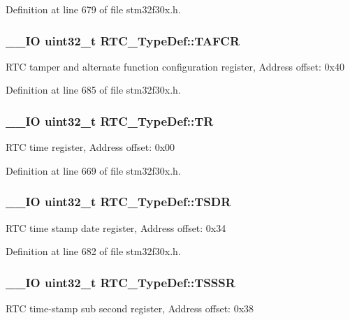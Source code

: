 Definition at line 679 of file stm32f30x.\-h.

\hypertarget{struct_r_t_c___type_def_a498ecce9715c916dd09134fddd0072c0}{
\subsubsection[{T\-A\-F\-C\-R}]{\setlength{\rightskip}{0pt plus 5cm}\-\_\-\-\_\-\-I\-O {\bf uint32\-\_\-t} R\-T\-C\-\_\-\-Type\-Def\-::\-T\-A\-F\-C\-R}}\label{struct_r_t_c___type_def_a498ecce9715c916dd09134fddd0072c0}
R\-T\-C tamper and alternate function configuration register, Address offset\-: 0x40 

Definition at line 685 of file stm32f30x.\-h.

\hypertarget{struct_r_t_c___type_def_a2e8783857f8644a4eb80ebc51e1cba42}{
\subsubsection[{T\-R}]{\setlength{\rightskip}{0pt plus 5cm}\-\_\-\-\_\-\-I\-O {\bf uint32\-\_\-t} R\-T\-C\-\_\-\-Type\-Def\-::\-T\-R}}\label{struct_r_t_c___type_def_a2e8783857f8644a4eb80ebc51e1cba42}
R\-T\-C time register, Address offset\-: 0x00 

Definition at line 669 of file stm32f30x.\-h.

\hypertarget{struct_r_t_c___type_def_aa4633dbcdb5dd41a714020903fd67c82}{
\subsubsection[{T\-S\-D\-R}]{\setlength{\rightskip}{0pt plus 5cm}\-\_\-\-\_\-\-I\-O {\bf uint32\-\_\-t} R\-T\-C\-\_\-\-Type\-Def\-::\-T\-S\-D\-R}}\label{struct_r_t_c___type_def_aa4633dbcdb5dd41a714020903fd67c82}
R\-T\-C time stamp date register, Address offset\-: 0x34 

Definition at line 682 of file stm32f30x.\-h.

\hypertarget{struct_r_t_c___type_def_a1e8b4b987496ee1c0c6f16b0a94ea1a1}{
\subsubsection[{T\-S\-S\-S\-R}]{\setlength{\rightskip}{0pt plus 5cm}\-\_\-\-\_\-\-I\-O {\bf uint32\-\_\-t} R\-T\-C\-\_\-\-Type\-Def\-::\-T\-S\-S\-S\-R}}\label{struct_r_t_c___type_def_a1e8b4b987496ee1c0c6f16b0a94ea1a1}
R\-T\-C time-\/stamp sub second register, Address offset\-: 0x38 

